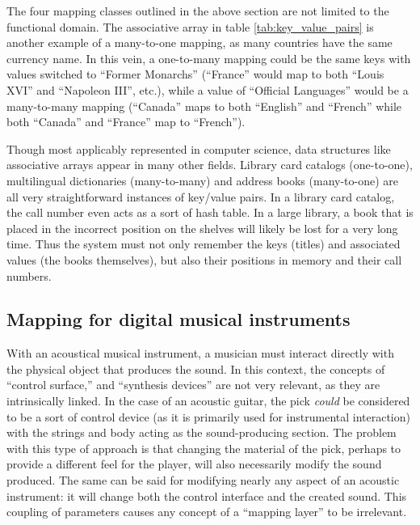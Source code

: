 The four mapping classes outlined in the above section are not limited to the functional domain. The associative array in table \ref{tab:key_value_pairs} is another example of a many-to-one mapping, as many countries have the same currency name. In this vein, a one-to-many mapping could be the same keys with values switched to ``Former Monarchs'' (``France'' would map to both ``Louis XVI'' and ``Napoleon III'', etc.), while a value of ``Official Languages'' would be a many-to-many mapping (``Canada'' maps to both ``English'' and ``French'' while both ``Canada'' and ``France'' map to ``French'').

Though most applicably represented in computer science, data structures like associative arrays appear in many other fields. Library card catalogs (one-to-one), multilingual dictionaries (many-to-many) and address books (many-to-one) are all very straightforward instances of key/value pairs. In a library card catalog, the call number even acts as a sort of hash table. In a large library, a book that is placed in the incorrect position on the shelves will likely be lost for a very long time. Thus the system must not only remember the keys (titles) and associated values (the books themselves), but also their positions in memory and their call numbers.


\subsection{Mapping for digital musical instruments} \label{sec:mappingforDMIs}

With an acoustical musical instrument, a musician must interact directly with the physical object that produces the sound. In this context, the concepts of ``control surface,'' and ``synthesis devices'' are not very relevant, as they are intrinsically linked. In the case of an acoustic guitar, the pick \emph{could} be considered to be a sort of control device (as it is primarily used for instrumental interaction) with the strings and body acting as the sound-producing section. The problem with this type of approach is that changing the material of the pick, perhaps to provide a different feel for the player, will also necessarily modify the sound produced. The same can be said for modifying nearly any aspect of an acoustic instrument: it will change both the control interface and the created sound. This coupling of parameters causes any concept of a ``mapping layer'' to be irrelevant.

